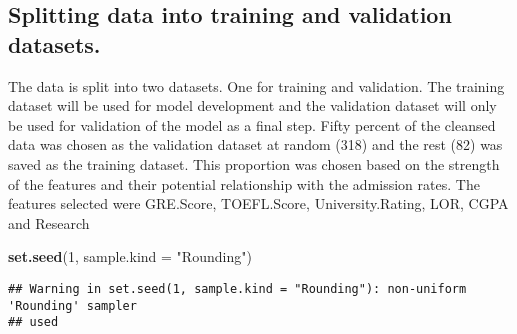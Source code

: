 \documentclass[11pt,]{article}
\newenvironment{Shaded}{\begin{snugshade}}{\end{snugshade}}
\newcommand{\CommentTok}[1]{\textcolor[rgb]{0.56,0.35,0.01}{\textit{#1}}}
\newcommand{\DataTypeTok}[1]{\textcolor[rgb]{0.13,0.29,0.53}{#1}}
\newcommand{\DecValTok}[1]{\textcolor[rgb]{0.00,0.00,0.81}{#1}}
\newcommand{\FloatTok}[1]{\textcolor[rgb]{0.00,0.00,0.81}{#1}}
\newcommand{\KeywordTok}[1]{\textcolor[rgb]{0.13,0.29,0.53}{\textbf{#1}}}
\newcommand{\NormalTok}[1]{#1}
\newcommand{\OperatorTok}[1]{\textcolor[rgb]{0.81,0.36,0.00}{\textbf{#1}}}
\newcommand{\StringTok}[1]{\textcolor[rgb]{0.31,0.60,0.02}{#1}}
\begin{document}
\begin{Shaded}
\end{Shaded}

\hypertarget{splitting-data-into-training-and-validation-datasets.}{%
\subsection{Splitting data into training and validation
datasets.}\label{splitting-data-into-training-and-validation-datasets.}}

The data is split into two datasets. One for training and validation.
The training dataset will be used for model development and the
validation dataset will only be used for validation of the model as a
final step. Fifty percent of the cleansed data was chosen as the
validation dataset at random (318) and the rest (82) was saved as the
training dataset. This proportion was chosen based on the strength of
the features and their potential relationship with the admission rates.
The features selected were GRE.Score, TOEFL.Score, University.Rating,
LOR, CGPA and Research

\begin{Shaded}
\begin{Highlighting}[]
\KeywordTok{set.seed}\NormalTok{(}\DecValTok{1}\NormalTok{, }\DataTypeTok{sample.kind =} \StringTok{"Rounding"}\NormalTok{)}
\end{Highlighting}
\end{Shaded}

\begin{verbatim}
## Warning in set.seed(1, sample.kind = "Rounding"): non-uniform 'Rounding' sampler
## used
\end{verbatim}

\begin{Shaded}
\end{Shaded}
\end{document}
